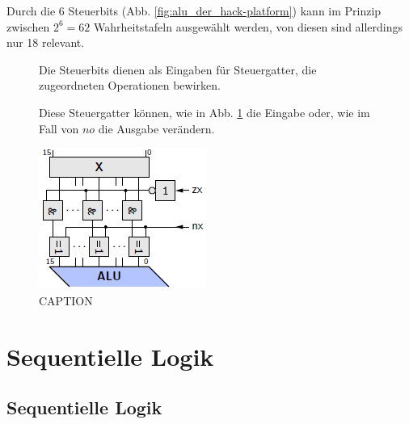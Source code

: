 \documentclass[12pt]{report}
\begin{document}
Durch die 6 Steuerbits (Abb. \ref{fig:alu_der_hack-platform}) kann im Prinzip zwischen 
$2^6=62$ Wahrheitstafeln ausgewählt werden, von diesen sind allerdings nur 18 relevant.

\begin{defbox}
  \begin{figure}[H]
    \begin{minipage}[t]{0.45\textwidth}
      Die Steuerbits dienen als Eingaben für Steuergatter, die zugeordneten
      Operationen bewirken.
      
      Diese Steuergatter können, wie in Abb. \ref{fig:alu_steuerbits} die Eingabe oder,
      wie im Fall von $no$ die Ausgabe verändern.
    \end{minipage}
    \hfill
    \begin{minipage}[t]{0.45\textwidth}
      \caption{CAPTION}
      \label{fig:alu_steuerbits}
      \centering
      \includegraphics{alu_steuerbits}
    \end{minipage}
  \end{figure}
\end{defbox}



\chapter{Sequentielle Logik}
\section{Sequentielle Logik}
\end{document}
